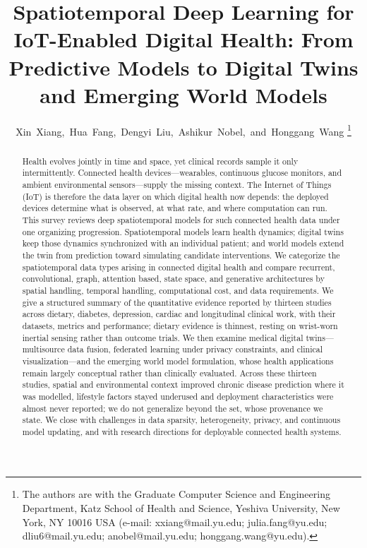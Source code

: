 \documentclass[journal]{IEEEtran}
\begin{document}
\title{Spatiotemporal Deep Learning for IoT-Enabled Digital Health: From Predictive Models to Digital Twins and Emerging World Models}

\author{Xin~Xiang,~Hua~Fang,~Dengyi~Liu,~Ashikur~Nobel,~and~Honggang~Wang%
\thanks{The authors are with the Graduate Computer Science and Engineering Department, Katz School of Health and Science, Yeshiva University, New York, NY 10016 USA (e-mail: xxiang@mail.yu.edu; julia.fang@yu.edu; dliu6@mail.yu.edu; anobel@mail.yu.edu; honggang.wang@yu.edu).}}

\maketitle

\begin{abstract}
Health evolves jointly in time and space, yet clinical records sample it only intermittently. Connected health devices---wearables, continuous glucose monitors, and ambient environmental sensors---supply the missing context. The Internet of Things (IoT) is therefore the data layer on which digital health now depends: the deployed devices determine what is observed, at what rate, and where computation can run. This survey reviews deep spatiotemporal models for such connected health data under one organizing progression. Spatiotemporal models learn health dynamics; digital twins keep those dynamics synchronized with an individual patient; and world models extend the twin from prediction toward simulating candidate interventions. We categorize the spatiotemporal data types arising in connected digital health and compare recurrent, convolutional, graph, attention based, state space, and generative architectures by spatial handling, temporal handling, computational cost, and data requirements. We give a structured summary of the quantitative evidence reported by thirteen studies across dietary, diabetes, depression, cardiac and longitudinal clinical work, with their datasets, metrics and performance; dietary evidence is thinnest, resting on wrist-worn inertial sensing rather than outcome trials. We then examine medical digital twins---multisource data fusion, federated learning under privacy constraints, and clinical visualization---and the emerging world model formulation, whose health applications remain largely conceptual rather than clinically evaluated. Across these thirteen studies, spatial and environmental context improved chronic disease prediction where it was modelled, lifestyle factors stayed underused and deployment characteristics were almost never reported; we do not generalize beyond the set, whose provenance we state. We close with challenges in data sparsity, heterogeneity, privacy, and continuous model updating, and with research directions for deployable connected health systems.
\end{abstract}
\end{document}
